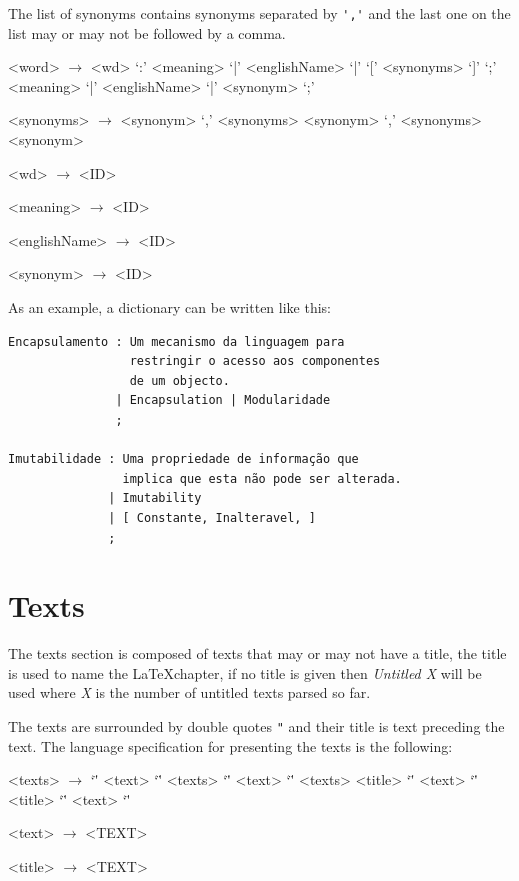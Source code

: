 \documentclass[a4paper]{report}
\begin{document}
The list of synonyms contains synonyms separated by \verb!','! and the last one
on the list may or may not be followed by a comma.

\begin{grammar}
    <word> $\to$ <wd> `:' <meaning> `|' <englishName> `|' `[' <synonyms> `]' `;'
    \alt <meaning> `|' <englishName> `|' <synonym> `;'

    <synonyms> $\to$ <synonym> `,'
    \alt <synonyms> <synonym> `,'
    \alt <synonyms> <synonym>

    <wd> $\to$ <ID>

    <meaning> $\to$ <ID>

    <englishName> $\to$ <ID>

    <synonym> $\to$ <ID>
\end{grammar}

As an example, a dictionary can be written like this:

\begin{verbatim}
Encapsulamento : Um mecanismo da linguagem para
                 restringir o acesso aos componentes
                 de um objecto.
               | Encapsulation | Modularidade
               ;

Imutabilidade : Uma propriedade de informação que
                implica que esta não pode ser alterada.
              | Imutability
              | [ Constante, Inalteravel, ]
              ;
\end{verbatim}

\section{Texts}\label{sec:texts}

The texts section is composed of texts that may or may not have a title, the
title is used to name the \LaTeX chapter, if no title is given then
\textit{Untitled X} will be used where \textit{X} is the number of untitled
texts parsed so far.

The texts are surrounded by double quotes \verb!"! and their title is text
preceding the text. The language specification for presenting the texts is the
following:

\begin{grammar}
    <texts> $\to$ `\"' <text> `\"'
    \alt <texts> `\"' <text> `\"'
    \alt <texts> <title> `\"' <text> `\"'
    \alt <title> `\"' <text> `\"'

    <text> $\to$ <TEXT>

    <title> $\to$ <TEXT>
\end{grammar}
\end{document}
